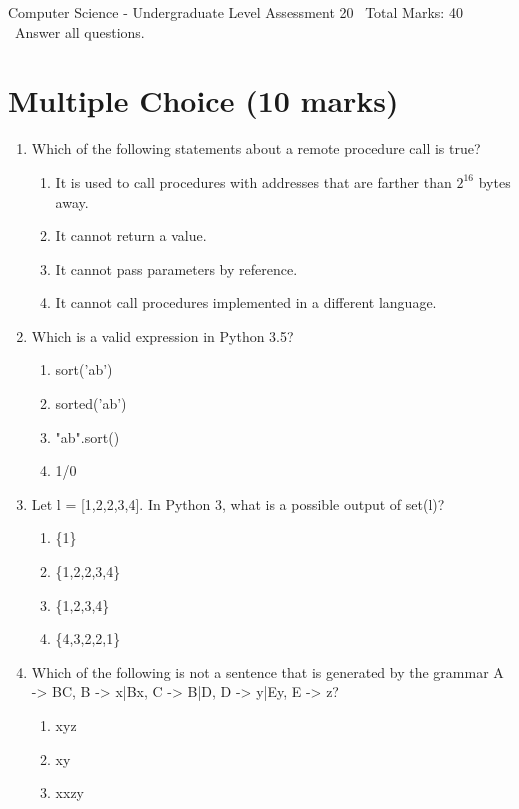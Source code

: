 \documentclass[12pt]{article}
\begin{document}
\begin{center}
Computer Science - Undergraduate Level Assessment 20 \
Total Marks: 40 \
Answer all questions.
\end{center}

\section*{Multiple Choice (10 marks)}
\begin{enumerate}[label=\arabic*.]
\item Which of the following statements about a remote procedure call is true?
\begin{enumerate}[label=(\alph*)]
    \item It is used to call procedures with addresses that are farther than $2^16$ bytes away.
    \item It cannot return a value.
    \item It cannot pass parameters by reference.
    \item It cannot call procedures implemented in a different language.
\end{enumerate}
\item Which is a valid expression in Python 3.5?
\begin{enumerate}[label=(\alph*)]
    \item sort('ab')
    \item sorted('ab')
    \item "ab".sort()
    \item 1/0
\end{enumerate}
\item Let l = [1,2,2,3,4]. In Python 3, what is a possible output of set(l)?
\begin{enumerate}[label=(\alph*)]
    \item \{1\}
    \item \{1,2,2,3,4\}
    \item \{1,2,3,4\}
    \item \{4,3,2,2,1\}
\end{enumerate}
\item Which of the following is not a sentence that is generated by the grammar A -\textgreater{} BC, B -\textgreater{} x|Bx, C -\textgreater{} B|D, D -\textgreater{} y|Ey, E -\textgreater{} z?
\begin{enumerate}[label=(\alph*)]
    \item xyz
    \item xy
    \item xxzy

\end{enumerate}
\end{enumerate}
\end{document}
